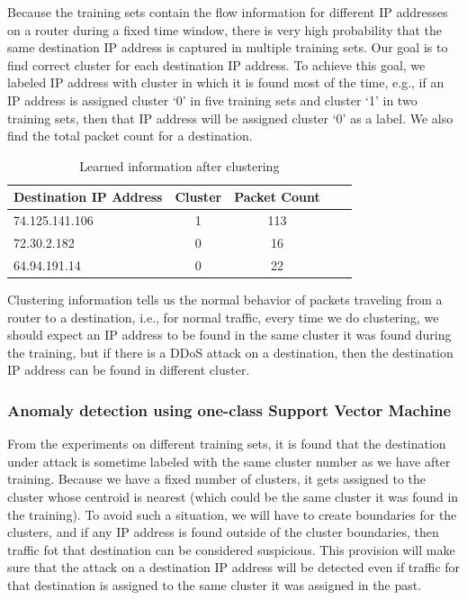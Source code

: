 \documentclass[12pt,oneside,a4paper]{article}
\begin{document}
Because the training sets contain the flow information for different IP addresses on a router during a fixed time window, there is very high probability that the same destination IP address is captured in multiple training sets. Our goal is to find correct cluster for each destination IP address. To achieve this goal, we labeled IP address with cluster in which it is found most of the time, e.g., if an IP address is assigned cluster `0' in five training sets and cluster `1' in two training sets, then that IP address will be assigned cluster `0' as a label. We also find the total packet count for a destination.

\begin{table}[H]
\centering
  \begin{tabular}{| l | c | c | c | c |}
    \hline
    {Destination IP Address}  &Cluster  &Packet Count \\
    \hline
    74.125.141.106  & 1     & 113  \\ \hline
    72.30.2.182     & 0     & 16   \\ \hline
    64.94.191.14    & 0     & 22   \\ \hline
  \end{tabular}
\caption{Learned information after clustering} \label{table:learned-clustering}
\end{table}

Clustering information tells us the normal behavior of packets traveling from a router to a destination, i.e., for normal traffic, every time we do clustering, we should expect an IP address to be found in the same cluster it was found during the training, but if there is a DDoS attack on a destination, then the destination IP address can be found in different cluster.

\subsubsection{Anomaly detection using one-class Support Vector Machine} \label{subsec:Anomaly_Detection}

From the experiments on different training sets, it is found that the destination under attack is sometime labeled with the same cluster number as we have after training. Because we have a fixed number of clusters, it gets assigned to the cluster whose centroid is nearest (which could be the same cluster it was found in the training). To avoid such a situation, we will have to create boundaries for the clusters, and if any IP address is found outside of the cluster boundaries, then traffic fot that destination can be considered suspicious. This provision will make sure that the attack on a destination IP address will be detected even if traffic for that destination is assigned to the same cluster it was assigned in the past.
\end{document}
